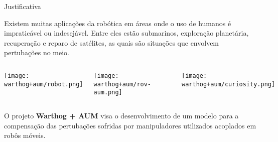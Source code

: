 \begin{frame}[t]{Justificativa} 

    \text  Existem muitas aplicações da robótica em áreas onde o uso de humanos é impraticável ou indesejável. Entre eles estão submarinos, exploração planetária, recuperação e reparo de satélites, as quais são situações que envolvem pertubações no meio.

        \begin{columns}[t]

            \begin{center}
                \texttt{[image: warthog+aum/robot.png]}
            \end{center}

            \begin{center}
                \texttt{[image: warthog+aum/rov-aum.png]}
            \end{center}

            \begin{center}
                \begin{figure}
                    \texttt{[image: warthog+aum/curiosity.png]}
                \end{figure}
            \end{center}

        \end{columns}
        O projeto \textbf{Warthog + AUM} visa o desenvolvimento de um modelo para a compensação das pertubações sofridas por manipuladores utilizados acoplados em robôs móveis.
\end{frame}

